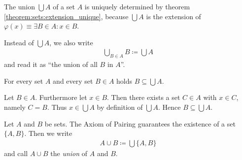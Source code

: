 \begin{remarks}
    \begin{remarkenumerate}
        \item The union $\bigcup A$ of a set $A$ is uniquely determined by theorem \ref{theorem:sets:extension_unique}, because $\bigcup A$ is the extension of $\varphi(x)\equiv \exists B\in A\colon x\in B$.
        \item Instead of $\bigcup A$, we also write \begin{align}\bigcup_{B\in A} B\coloneq\bigcup A\end{align} and read it as \enquote{the union of all $B$ in $A$}.
        \item\label{remark:sets:union_subsets} For every set $A$ and every set $B\in A$ holds $B\subseteq \bigcup A$.
        \begin{miniproof}
            Let $B\in A$. Furthermore let $x\in B$. Then there exists a set $C\in A$ with $x\in C$, namely $C=B$. Thus $x\in\bigcup A$ by definition of $\bigcup A$. Hence $B\subseteq \bigcup A$.
        \end{miniproof}
    \end{remarkenumerate}
\end{remarks}

\begin{definition}
    Let $A$ and $B$ be sets. The Axiom of Pairing guarantees the existence of a set $\{A,B\}$. Then we write \begin{align}A\cup B\coloneq\bigcup \{A,B\}\end{align} and call $A\cup B$ the \emph{union} of $A$ and $B$.
\end{definition}

